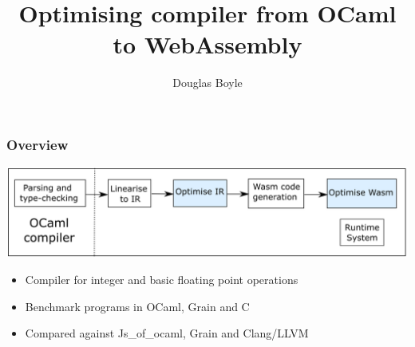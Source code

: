 \documentclass{beamer}
\title[]{Optimising compiler from OCaml to WebAssembly} %
\author{Douglas Boyle} %
\date{\formatdate{11}{2}{2021}} %
\begin{document}
\begin{frame}
\titlepage %
\end{frame}



\begin{frame}\frametitle{Overview} 
\includegraphics[scale=0.37]{overview}
\begin{itemize}
\item Compiler for integer and basic floating point operations
\item Benchmark programs in OCaml, Grain and C
\item Compared against Js\_of\_ocaml, Grain and Clang/LLVM
\end{itemize}
\end{frame}
\end{document}

